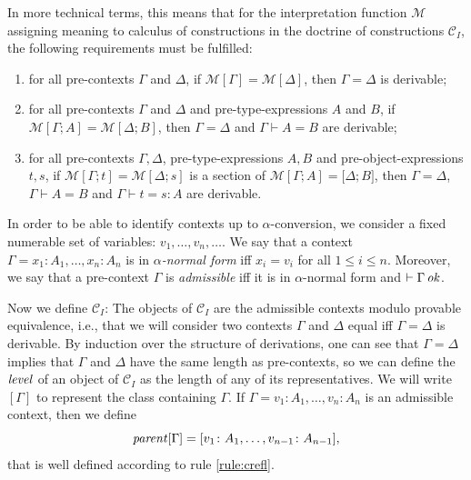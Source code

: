 In more technical terms, this means that for the interpretation function $\mathcal{M}$ assigning meaning
to calculus of constructions in the doctrine of constructions $\mathcal{C}_I$, the following requirements
must be fulfilled:
\begin{enumerate}
    \item for all pre-contexts $\Gamma$ and $\Delta$, if $\mathcal{M}[\Gamma] = \mathcal{M}[\Delta]$,
          then $\Gamma = \Delta$ is derivable;
    \item for all pre-contexts $\Gamma$ and $\Delta$ and pre-type-expressions $A$ and $B$, if 
          $\mathcal{M}[\Gamma; A] = \mathcal{M}[\Delta; B]$, then $\Gamma = \Delta$ and 
          $\Gamma \vdash A = B$ are derivable;
    \item for all pre-contexts $\Gamma, \Delta$, pre-type-expressions $A, B$ and pre-object-expressions
          $t, s$, if $\mathcal{M}[\Gamma; t] = \mathcal{M}[\Delta; s]$ is a section of $\mathcal{M}[\Gamma; A] = \mathcal[\Delta; B]$,
          then $\Gamma = \Delta$, $\Gamma \vdash A = B$ and $\Gamma \vdash t = s \colon A$ are derivable.
\end{enumerate}

In order to be able to identify contexts up to $\alpha$-conversion, we consider a fixed numerable set of variables:
$v_1, \dots, v_n, \dots$. We say that a context $\Gamma = x_1 \colon A_1, \dots, x_n \colon A_n$ is in 
\textit{$\alpha$-normal form} iff $x_i = v_i$ for all $1 \leq i \leq n$.
Moreover, we  say that a pre-context $\Gamma$ is \textit{admissible} iff it is in $\alpha$-normal form and $\vdash \Gamma \operatorname{\mathit{\space ok}}$.

Now we  define $\mathcal{C}_I$:
The objects of $\mathcal{C}_I$ are the admissible contexts modulo provable equivalence, i.e., that we will consider 
two contexts $\Gamma$ and $\Delta$ equal iff $\Gamma = \Delta$ is derivable.
By induction over the structure of derivations, one can see that $\Gamma = \Delta$ implies that $\Gamma$ and
$\Delta$ have the same length as pre-contexts, so we can define the $\operatorname{\mathit{level}}$ of an object of $\mathcal{C}_I$ as the length
of any of its representatives. We will write $[\Gamma]$ to represent the class containing $\Gamma$.
If $\Gamma = v_1 \colon A_1, \dots, v_n \colon A_n$ is an admissible context, then we define
\[
    \operatorname{\mathit{parent}}[\Gamma] = [ v_1 \colon A_1, \dots, v_{n-1} \colon A_{n-1} ],
\]
that is well defined according to rule \ref{rule:crefl}.

